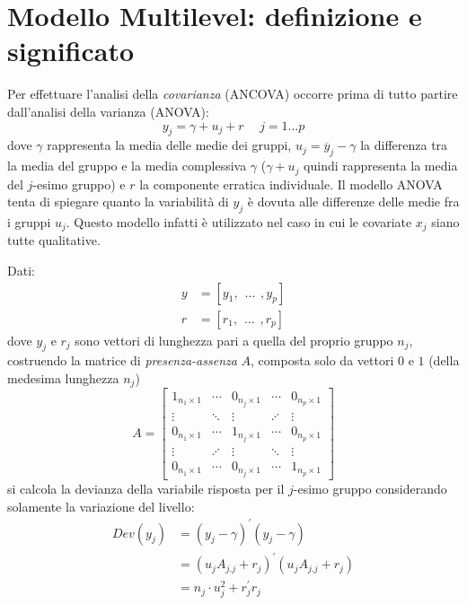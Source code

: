 \documentclass[a4page, 11pt]{article} %
\begin{document}
\section{Modello Multilevel: definizione e significato}
Per effettuare l'analisi della \textit{covarianza} (ANCOVA) occorre prima di tutto partire dall'analisi della varianza (ANOVA):
\begin{equation*}
y_{j} = \gamma + u_j + r \hspace{15pt} j = 1 \dots p
\end{equation*}
dove $\gamma$ rappresenta la media delle medie dei gruppi, $u_j = \overline{y}_j - \gamma$ la differenza tra la media del gruppo e la media complessiva $\gamma$ ($\gamma + u_j$ quindi rappresenta la media del $j$-esimo gruppo) e $r$ la componente erratica individuale.
Il modello ANOVA tenta di spiegare quanto la variabilità di $y_j$ è dovuta alle differenze delle medie fra i gruppi $u_j$.
Questo modello infatti è utilizzato nel caso in cui le covariate $x_j$ siano tutte qualitative.

Dati:
\begin{align*}
y &= [y_1,\hspace{5pt} \dots \hspace{5pt} ,y_p] \\
r &=[r_1, \hspace{5pt} \dots \hspace{5pt}, r_p] 
\end{align*}
dove $y_j$ e $r_j$ sono vettori di lunghezza pari a quella del proprio gruppo $n_j$, costruendo la matrice di \textit{presenza-assenza} $A$, composta solo da vettori $0$ e $1$ (della medesima lunghezza $n_j$)
\begin{equation*}
  A=
\begin{bmatrix}
  1_{n_1 \times 1} & \cdots & 0_{n_j \times 1} & \cdots & 0_{n_p \times 1} \\
  \vdots & \ddots & \vdots & \iddots & \vdots \\
  0_{n_1 \times 1} & \cdots & 1_{n_j \times 1} & \cdots & 0_{n_p \times 1} \\
  \vdots & \iddots & \vdots & \ddots & \vdots \\
  0_{n_1 \times 1} & \cdots  & 0_{n_j \times 1} & \cdots & 1_{n_p \times 1}
\end{bmatrix}
\end{equation*}
si calcola la devianza della variabile risposta per il $j$-esimo gruppo considerando solamente la variazione del livello:
\begin{align*}
  Dev(y_j) &= (y_j - \gamma)^\prime (y_j - \gamma) \\
           &= (u_j A_{j.j} + r_j)^\prime (u_j A_{j.j} + r_j) \\
           &= n_j \cdot u_j^2 + r_j^\prime r_j
\end{align*}
\end{document}
